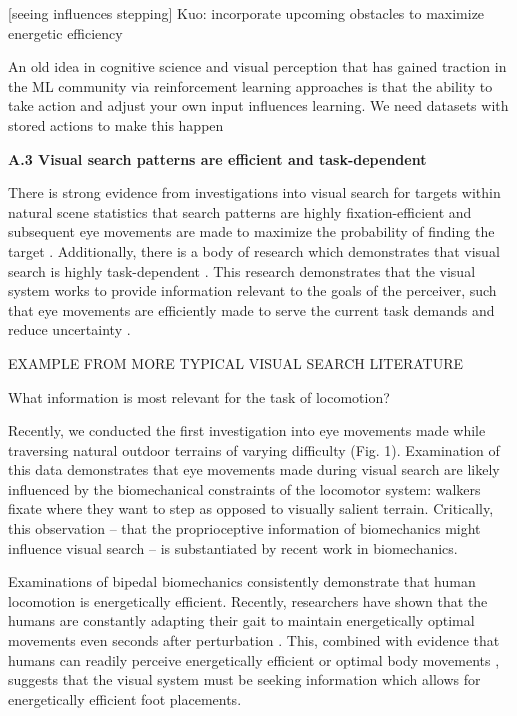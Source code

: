 [seeing influences stepping] 
Kuo: incorporate upcoming obstacles to maximize energetic efficiency

An old idea in cognitive science and visual perception that has gained traction in the ML community via reinforcement learning approaches is that the ability to take action and adjust your own input influences learning. We need datasets with stored actions to make this happen

\noindent \textbf{A.3 Visual search patterns are efficient and task-dependent}

\noindent There is strong evidence from investigations into visual search for targets within natural scene statistics that search patterns are highly fixation-efficient and subsequent eye movements are made to maximize the probability of finding the target \cite{najemnik_optimal_2005}. Additionally, there is a body of research which demonstrates that visual search is highly task-dependent \cite{jovancevic-misic2009, tong2017, zhang2018, hayhoe2005, tatler2011, rothkopf2016}. This research demonstrates that the visual system works to provide information relevant to the goals of the perceiver, such that eye movements are efficiently made to serve the current task demands and reduce uncertainty \cite{Matthis2018}. 

EXAMPLE FROM MORE TYPICAL VISUAL SEARCH LITERATURE

What information is most relevant for the task of locomotion?

Recently, we conducted the first investigation into eye movements made while traversing natural outdoor terrains of varying difficulty \cite{Matthis2018,hayhoe2018} (Fig. 1). Examination of this data demonstrates that eye movements made during visual search are likely influenced by the biomechanical constraints of the locomotor system: walkers fixate where they want to step as opposed to visually salient terrain. Critically, this observation – that the proprioceptive information of biomechanics might influence visual search – is substantiated by recent work in biomechanics.

Examinations of bipedal biomechanics consistently demonstrate that human locomotion is energetically efficient\cite{Kuo2002,Donelan2002}. Recently, researchers have shown that the humans are constantly adapting their gait to maintain energetically optimal movements even seconds after perturbation \cite{selinger2015}. This, combined with evidence that humans can readily perceive energetically efficient\cite{warren1984} or optimal body movements \cite{weast-knapp2019}, suggests that the visual system must be seeking information which allows for energetically efficient foot placements.

